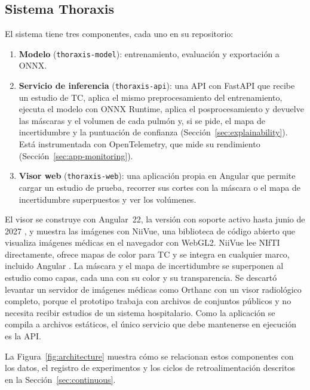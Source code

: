 \subsection{Sistema Thoraxis}\label{sec:system}
El sistema tiene tres componentes, cada uno en su repositorio:

\begin{enumerate}
    \item \textbf{Modelo} (\texttt{thoraxis-model}): entrenamiento,
          evaluación y exportación a ONNX.
    \item \textbf{Servicio de inferencia} (\texttt{thoraxis-api}): una API con
          FastAPI que recibe un estudio de TC, aplica el mismo preprocesamiento
          del entrenamiento, ejecuta el modelo con ONNX Runtime, aplica el
          posprocesamiento y devuelve las máscaras y el volumen de cada pulmón
          y, si se pide, el mapa de incertidumbre y la puntuación de confianza
          (Sección~\ref{sec:explainability}). Está instrumentada con
          OpenTelemetry, que mide su rendimiento
          (Sección~\ref{sec:app-monitoring}).
    \item \textbf{Visor web} (\texttt{thoraxis-web}): una aplicación propia en
          Angular que permite cargar un estudio de prueba, recorrer sus cortes
          con la máscara o el mapa de incertidumbre superpuestos y ver los
          volúmenes.
\end{enumerate}

El visor se construye con Angular~22, la versión con soporte activo hasta
junio de 2027 \parencite{angular}, y muestra las imágenes con NiiVue, una
biblioteca de código abierto que visualiza imágenes médicas en el navegador
con WebGL2. NiiVue lee NIfTI directamente, ofrece mapas de color para TC y se
integra en cualquier marco, incluido Angular \parencite{niivue}. La máscara y
el mapa de incertidumbre se superponen al estudio como capas, cada una con su
color y su transparencia. Se descartó levantar un servidor de imágenes médicas
como Orthanc con un visor radiológico completo, porque el prototipo trabaja con
archivos de conjuntos públicos y no necesita recibir estudios de un sistema
hospitalario. Como la aplicación se compila a archivos estáticos, el único
servicio que debe mantenerse en ejecución es la API.

La Figura~\ref{fig:architecture} muestra cómo se relacionan estos componentes
con los datos, el registro de experimentos y los ciclos de retroalimentación
descritos en la Sección~\ref{sec:continuous}.

